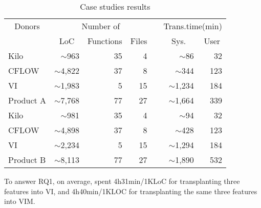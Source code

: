 \begin{table}[h]\centering 

    \caption{Case studies results} 
    \label{tab:transplantation_time}
	\begin{center}
	\begin{tabular}{lrrrrrr} \hline
		\multicolumn{1}{c}{Donors} & \multicolumn{3}{c}{Number of}   & &\multicolumn{2}{c}{Trans.time(min)} \\
		\cline{2-4} \cline{6-7}
		 & \multicolumn{1}{c}{LoC}  & \multicolumn{1}{c}{Functions} & \multicolumn{1}{c}{Files} & & \multicolumn{1}{c}{Sys.} & \multicolumn{1}{c}{User}\\\hline
		Kilo        & $\sim$963 & 35 & 4 & & $\sim$86 & 32\\
		CFLOW       & $\sim$4,822 & 37 & 8 &  & $\sim$344 &123 \\
		VI          & $\sim$1,983 & 5 & 15 &  & $\sim$1,234 &184\\\hline
		\rowcolor[gray]{.9} Product A  &$\sim$7,768 & 77 & 27 & & $\sim$1,664 & 339 \\\hline
		Kilo        & $\sim$981 & 35 & 4 & & $\sim$94 & 32\\
		CFLOW       & $\sim$4,898 & 37 & 8 &  & $\sim$428 & 123\\
		VI          & $\sim$2,234 & 5 & 15 &  & $\sim$1,294 & 184\\\hline
		\rowcolor[gray]{.9} Product B  & $\sim$8,113 & 77 & 27 & & $\sim$1,890 &532\\\hline
	\end{tabular}
	\end{center}
	
\end{table}

\begin{framed}
\noindent To answer RQ1, on average, \prodscalpel spent 4h31min/1KLoC for transplanting three features into VI, and 4h40min/1KLOC for transplanting the same three features into VIM.
\end{framed}

